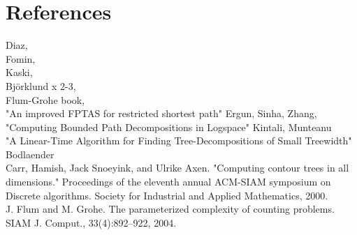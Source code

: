 \documentclass[a4paper,11pt]{report}
\theoremstyle{plain}
\theoremstyle{definition}
\begin{document}
\chapter*{References}

Diaz,\\
Fomin,\\
Kaski,\\
Björklund x 2-3,\\
Flum-Grohe book, \\
"An improved FPTAS for restricted shortest path" Ergun, Sinha, Zhang,\\
"Computing Bounded Path Decompositions in Logspace" Kintali, Munteanu\\
"A Linear-Time Algorithm for Finding Tree-Decompositions of Small Treewidth" Bodlaender\\
Carr, Hamish, Jack Snoeyink, and Ulrike Axen. "Computing contour trees in all dimensions." Proceedings of the eleventh annual ACM-SIAM symposium on Discrete algorithms. Society for Industrial and Applied Mathematics, 2000.\\
J. Flum and M. Grohe. The parameterized complexity of counting problems. SIAM J. Comput., 33(4):892–922, 2004.
\end{document}
